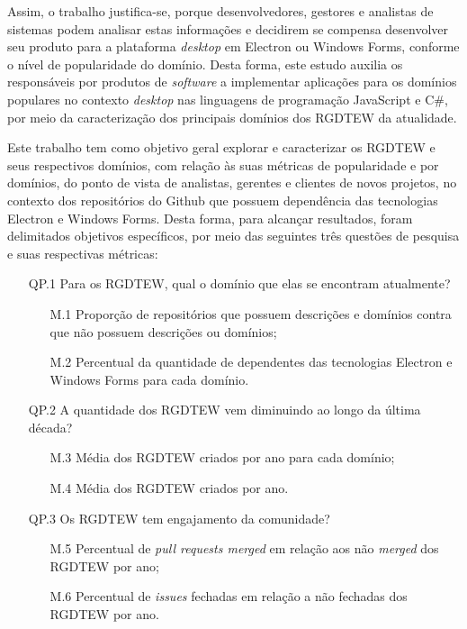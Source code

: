 \documentclass[12pt]{article}
\begin{document}
Assim, o trabalho justifica-se, porque desenvolvedores, gestores e analistas de sistemas podem analisar estas informações e decidirem se compensa desenvolver seu produto para a plataforma \textit{desktop} em Electron ou Windows Forms, conforme o nível de popularidade do domínio. Desta forma, este estudo auxilia os responsáveis por produtos de \textit{software} a implementar aplicações para os domínios populares no contexto \textit{desktop} nas linguagens de programação JavaScript e C\#, por meio da caracterização dos principais domínios dos RGDTEW da atualidade.

Este trabalho tem como objetivo geral explorar e caracterizar os RGDTEW e seus respectivos domínios, com relação às suas métricas de popularidade e por domínios, do ponto de vista de analistas, gerentes e clientes de novos projetos, no contexto dos repositórios do Github que possuem dependência das tecnologias Electron e Windows Forms. Desta forma, para alcançar resultados, foram delimitados objetivos específicos, por meio das seguintes três questões de pesquisa e suas respectivas métricas:

\begin{enumerate}
  \item[QP.1] Para os RGDTEW, qual o domínio que elas se encontram atualmente?
    \begin{enumerate}
        \item[M.1] Proporção de repositórios que possuem descrições e domínios contra que não possuem descrições ou domínios;
        \item[M.2] Percentual da quantidade de dependentes das tecnologias Electron e Windows Forms para cada domínio.
    \end{enumerate}
  \item[QP.2] A quantidade dos RGDTEW vem diminuindo ao longo da última década?
    \begin{enumerate}
        \item[M.3] Média dos RGDTEW criados por ano para cada domínio;
        \item[M.4] Média dos RGDTEW criados por ano.
    \end{enumerate}
  \item[QP.3] Os RGDTEW tem engajamento da comunidade?
    \begin{enumerate}
        \item[M.5] Percentual de \textit{pull requests merged} em relação aos não \textit{merged} dos RGDTEW por ano;
        \item[M.6] Percentual de \textit{issues} fechadas em relação a não fechadas dos RGDTEW por ano.
    \end{enumerate}
\end{enumerate}
\end{document}
